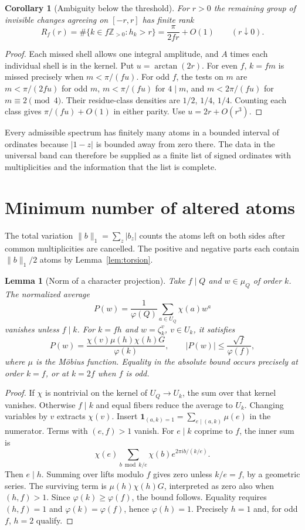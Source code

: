 \documentclass[11pt,letterpaper]{article}
\newtheorem{lemma}[theorem]{Lemma}
\newtheorem{corollary}[theorem]{Corollary}
\newcommand{\Z}{\mathbb Z}
\newcommand{\one}{\mathbf 1}
\begin{document}
\begin{corollary}[Ambiguity below the threshold]\label{cor:rank}
For $r>0$ the remaining group of invisible changes agreeing on $[-r,r]$ has finite rank
\[
 R_f(r)=\#\{k\in f\Z_{>0}:h_k>r\}
       =\frac{\pi}{2fr}+O(1)\qquad(r\downarrow0).
\]
\end{corollary}
\begin{proof}
Each missed shell allows one integral amplitude, and $A$ times each individual shell is in the kernel. Put $u=\arctan(2r)$. For even $f$, $k=fm$ is missed precisely when $m<\pi/(fu)$. For odd $f$, the tests on $m$ are $m<\pi/(2fu)$ for odd $m$, $m<\pi/(fu)$ for $4\mid m$, and $m<2\pi/(fu)$ for $m\equiv2\pmod4$. Their residue-class densities are $1/2$, $1/4$, $1/4$. Counting each class gives $\pi/(fu)+O(1)$ in either parity. Use $u=2r+O(r^3)$.
\end{proof}

Every admissible spectrum has finitely many atoms in a bounded interval of ordinates because $|1-z|$ is bounded away from zero there. The data in the universal band can therefore be supplied as a finite list of signed ordinates with multiplicities and the information that the list is complete.

\section{Minimum number of altered atoms}

The total variation $\|b\|_1=\sum_z|b_z|$ counts the atoms left on both sides after common multiplicities are cancelled. The positive and negative parts each contain $\|b\|_1/2$ atoms by Lemma~\ref{lem:torsion}.

\begin{lemma}[Norm of a character projection]\label{lem:norm}
Take $f\mid Q$ and $w\in\mu_Q$ of order $k$. The normalized average
\[
 P(w)=\frac{1}{\varphi(Q)}\sum_{a\in U_Q}\chi(a)w^a
\]
vanishes unless $f\mid k$. For $k=fh$ and $w=\zeta_k^v$, $v\in U_k$, it satisfies
\begin{equation}\label{eq:projection}
 P(w)=\frac{\chi(v)\mu(h)\chi(h)G}{\varphi(k)},\qquad
 |P(w)|\le\frac{\sqrt f}{\varphi(f)} ,
\end{equation}
where $\mu$ is the M\"obius function. Equality in the absolute bound occurs precisely at order $k=f$, or at $k=2f$ when $f$ is odd.
\end{lemma}
\begin{proof}
If $\chi$ is nontrivial on the kernel of $U_Q\to U_k$, the sum over that kernel vanishes. Otherwise $f\mid k$ and equal fibers reduce the average to $U_k$. Changing variables by $v$ extracts $\chi(v)$. Insert $\one_{(a,k)=1}=\sum_{e\mid(a,k)}\mu(e)$ in the numerator. Terms with $(e,f)>1$ vanish. For $e\mid k$ coprime to $f$, the inner sum is
\[
 \chi(e)\sum_{b\bmod k/e}\chi(b)e^{2\pi i b/(k/e)} .
\]
Then $e\mid h$. Summing over lifts modulo $f$ gives zero unless $k/e=f$, by a geometric series. The surviving term is $\mu(h)\chi(h)G$, interpreted as zero also when $(h,f)>1$. Since $\varphi(k)\ge\varphi(f)$, the bound follows. Equality requires $(h,f)=1$ and $\varphi(k)=\varphi(f)$, hence $\varphi(h)=1$. Precisely $h=1$ and, for odd $f$, $h=2$ qualify.
\end{proof}
\end{document}
